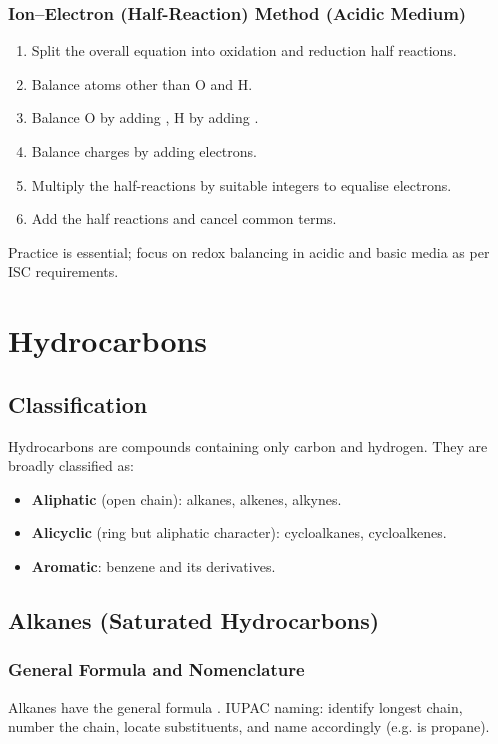 \documentclass[12pt,a4paper]{article}
\begin{document}
\subsubsection{Ion–Electron (Half-Reaction) Method (Acidic Medium)}
\begin{enumerate}
    \item Split the overall equation into oxidation and reduction half reactions.
    \item Balance atoms other than O and H.
    \item Balance O by adding , H by adding .
    \item Balance charges by adding electrons.
    \item Multiply the half-reactions by suitable integers to equalise electrons.
    \item Add the half reactions and cancel common terms.
\end{enumerate}

Practice is essential; focus on redox balancing in acidic and basic media as per ISC requirements.

\clearpage


\section{Hydrocarbons}

\subsection{Classification}
Hydrocarbons are compounds containing only carbon and hydrogen. They are broadly classified as:

\begin{itemize}
    \item \textbf{Aliphatic} (open chain): alkanes, alkenes, alkynes.
    \item \textbf{Alicyclic} (ring but aliphatic character): cycloalkanes, cycloalkenes.
    \item \textbf{Aromatic}: benzene and its derivatives.
\end{itemize}

\subsection{Alkanes (Saturated Hydrocarbons)}

\subsubsection{General Formula and Nomenclature}
Alkanes have the general formula .  
IUPAC naming: identify longest chain, number the chain, locate substituents, and name accordingly (e.g.  is propane).
\end{document}
